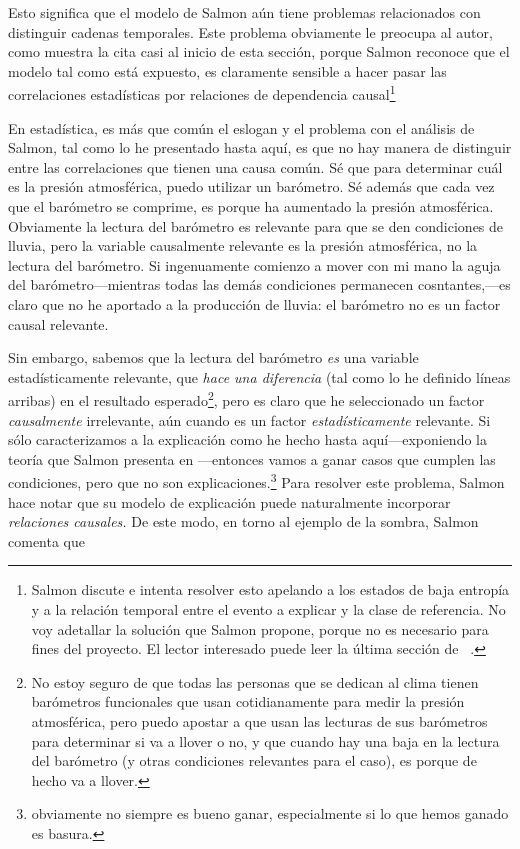 Esto significa que el modelo de Salmon aún tiene problemas relacionados con distinguir cadenas temporales. Este problema obviamente le preocupa al autor, como muestra la cita casi al inicio de esta sección, porque Salmon reconoce que el modelo tal como está expuesto, es claramente sensible a hacer pasar las correlaciones estadísticas por relaciones de dependencia causal\footnote{
	Salmon discute e intenta resolver esto apelando a los estados de baja entropía y a la relación temporal entre el evento a explicar y la clase de referencia. No voy adetallar la solución que Salmon propone,	porque no es necesario para fines del proyecto. El lector interesado	puede leer la última sección de \parencite{Salmon1970}~.
}

En estadística, es más que común el eslogan  y el problema con el análisis de Salmon, tal como lo he presentado hasta aquí,  es que no hay manera de distinguir entre las correlaciones que tienen una causa común. Sé que para determinar cuál es la presión atmosférica, puedo utilizar un barómetro. Sé además que cada vez que el barómetro se comprime, es porque ha aumentado la presión atmosférica. Obviamente la lectura del barómetro es relevante para que se den condiciones de lluvia, pero la variable causalmente relevante es la presión atmosférica, no la lectura del barómetro. Si ingenuamente comienzo a mover con mi mano la aguja del barómetro---mientras todas las demás condiciones permanecen cosntantes,---es claro que no he aportado a la producción de lluvia: el barómetro no es un factor causal relevante.

Sin embargo, sabemos que la lectura del barómetro \emph{es} una variable estadísticamente relevante, que \emph{hace una diferencia} (tal como lo he definido líneas arribas) en el resultado esperado\footnote{
	No estoy seguro de que todas las personas que se dedican al clima tienen barómetros funcionales que usan cotidianamente para medir la presión atmosférica, pero puedo	apostar a que usan las lecturas de sus barómetros para determinar si	va a llover o no, y que cuando hay una baja en la lectura del 	barómetro (y otras condiciones relevantes para el caso), es porque de	hecho va a llover.
},
pero es claro que he seleccionado un factor \emph{causalmente} irrelevante, aún cuando es un factor \emph{estadísticamente} relevante. Si sólo caracterizamos a la explicación como he hecho hasta aquí---exponiendo la teoría que Salmon presenta en \parencite{Salmon1970}---entonces vamos a ganar casos que cumplen las condiciones, pero que no son explicaciones.\footnote{
	obviamente no siempre es bueno ganar, especialmente si lo que hemos ganado es basura.
}
Para resolver este problema, Salmon hace notar que su modelo de explicación puede naturalmente incorporar \emph{relaciones causales.} De este modo, en torno al ejemplo de la sombra, Salmon comenta que

